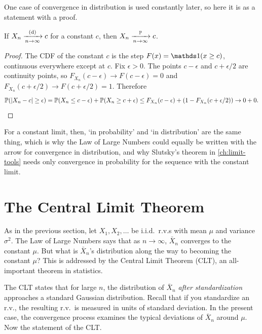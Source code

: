 One case of convergence in distribution is used constantly later, so here it is as a statement with a proof.

\begin{proposition}
\label{prop:convd-constant}
If $X_n \xrightarrow [n \to \infty ]{\text{(d)}} c$ for a constant $c$, then $X_n \xrightarrow [n \to \infty ]{\mathbb{P}} c$.
\end{proposition}

\begin{proof}
The CDF of the constant $c$ is the step $F(x) = \ind(x \geq c)$, continuous everywhere except at $c$.
Fix $\epsilon > 0$.
The points $c - \epsilon$ and $c + \epsilon/2$ are continuity points, so $F_{X_n}(c - \epsilon) \to F(c - \epsilon) = 0$ and $F_{X_n}(c + \epsilon/2) \to F(c + \epsilon/2) = 1$.
Therefore
\[
\mathbb{P}(\lvert X_n - c\rvert \geq \epsilon) = \mathbb{P}(X_n \leq c - \epsilon) + \mathbb{P}(X_n \geq c + \epsilon) \leq F_{X_n}(c - \epsilon) + \left( 1 - F_{X_n}(c + \epsilon/2) \right) \to 0 + 0. \qedhere
\]
\end{proof}

For a constant limit, then, `in probability' and `in distribution' are the same thing, which is why the Law of Large Numbers could equally be written with the arrow for convergence in distribution, and why Slutsky's theorem in \cref{ch:limit-tools} needs only convergence in probability for the sequence with the constant limit.

\section{The Central Limit Theorem}
\label{sec:clt}

As in the previous section, let $X_1, X_2, \ldots$ be i.i.d.\ r.v.s with mean $\mu$ and variance $\sigma^2$.
The Law of Large Numbers says that as $n \to \infty$, $\bar{X}_n$ converges to the constant $\mu$.
But what is $\bar{X}_n$'s distribution along the way to becoming the constant $\mu$?
This is addressed by the Central Limit Theorem (CLT), an all-important theorem in statistics.

The CLT states that for large $n$, the distribution of $\bar{X}_n$ \textit{after standardization} approaches a standard Gaussian distribution.
Recall that if you standardize an r.v., the resulting r.v.\ is measured in units of standard deviation.
In the present case, the convergence process examines the typical deviations of $\bar{X}_n$ around $\mu$.
Now the statement of the CLT.

